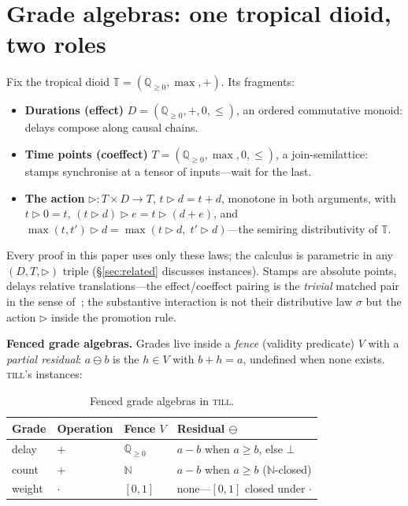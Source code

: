 \documentclass[11pt]{article}
\newcommand{\act}{\mathbin{\rhd}}                %
\newcommand{\res}{\mathbin{\ominus}}             %
\newcommand{\TT}{\mathbb{T}}                     %
\newcommand{\QQ}{\mathbb{Q}}                     %
\newcommand{\NN}{\mathbb{N}}                     %
\newcommand{\till}{\textsc{till}}                %
\theoremstyle{definition}
\theoremstyle{remark}
\begin{document}
\section{Grade algebras: one tropical dioid, two roles}
\label{sec:algebra}

Fix the tropical dioid $\TT = (\QQ_{\geq 0}, \max, +)$.  Its fragments:

\begin{itemize}
\item \textbf{Durations (effect)} $D = (\QQ_{\geq 0}, +, 0, \leq)$, an ordered
  commutative monoid: delays compose along causal chains.
\item \textbf{Time points (coeffect)} $T = (\QQ_{\geq 0}, \max, 0, \leq)$, a
  join-semilattice: stamps synchronise at a tensor of inputs---wait for the last.
\item \textbf{The action} ${\act} : T \times D \to T$, $t \act d = t+d$, monotone
  in both arguments, with $t \act 0 = t$, $(t \act d) \act e = t \act (d+e)$, and
  $\max(t,t') \act d = \max(t \act d,\; t' \act d)$---the semiring distributivity
  of $\TT$.
\end{itemize}

Every proof in this paper uses only these laws; the calculus is parametric in any
$(D, T, \act)$ triple (\S\ref{sec:related} discusses instances).  Stamps are
absolute points, delays relative translations---the effect/coeffect pairing is the
\emph{trivial} matched pair in the sense of~\cite{GaboardiICFP2016}; the
substantive interaction is not their distributive law $\sigma$ but the action
$\act$ inside the promotion rule.

\medskip
\noindent\textbf{Fenced grade algebras.}  Grades live inside a \emph{fence}
(validity predicate) $V$ with a \emph{partial residual}: $a \res b$ is the
$h \in V$ with $b + h = a$, undefined when none exists.  \till{}'s instances:

\begin{table}[ht]
\centering
\begin{tabular}{@{}llll@{}}
\toprule
Grade  & Operation & Fence $V$         & Residual $\res$ \\
\midrule
delay  & $+$ & $\QQ_{\geq 0}$        & $a - b$ when $a \geq b$, else $\bot$ \\
count  & $+$ & $\NN$                  & $a - b$ when $a \geq b$ ($\NN$-closed) \\
weight & $\cdot$ & $[0,1]$           & none---$[0,1]$ closed under $\cdot$ \\
\bottomrule
\end{tabular}
\caption{Fenced grade algebras in \till{}.}
\label{tab:grades}
\end{table}
\end{document}
